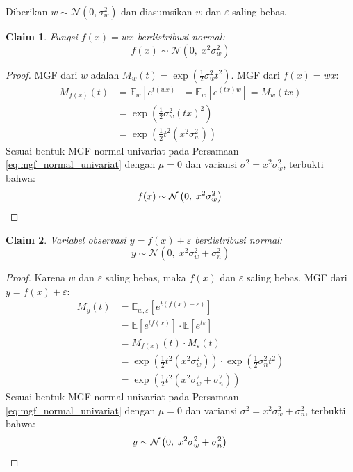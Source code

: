 \documentclass[11pt,a4paper]{article}
\theoremstyle{plain}
\newtheorem{claim}{Claim}[section]
\theoremstyle{definition}
\theoremstyle{remark}
\begin{document}
Diberikan $w \sim \mathcal{N}(0, \sigma_w^2)$ dan diasumsikan $w$ dan $\varepsilon$ saling bebas.

\begin{claim}
Fungsi $f(x) = wx$ berdistribusi normal:
\begin{equation}
f(x) \sim \mathcal{N}\left( 0, \; x^2 \sigma_w^2 \right)
\end{equation}
\end{claim}

\begin{proof}
MGF dari $w$ adalah $M_w(t) = \exp\left( \frac{1}{2}\sigma_w^2 t^2 \right)$. MGF dari $f(x) = wx$:
\begin{align}
M_{f(x)}(t) &= \mathbb{E}_w\left[ e^{t(wx)} \right] = \mathbb{E}_w\left[ e^{(tx)w} \right] = M_w(tx) \nonumber \\
&= \exp\left( \frac{1}{2}\sigma_w^2 (tx)^2 \right) \nonumber \\
&= \exp\left( \frac{1}{2} t^2 \left( x^2 \sigma_w^2 \right) \right) \label{eq:mgf_fx_kasus2}
\end{align}
Sesuai bentuk MGF normal univariat pada Persamaan \eqref{eq:mgf_normal_univariat} dengan $\mu = 0$ dan variansi $\sigma^2 = x^2 \sigma_w^2$, terbukti bahwa:
\begin{equation}
f(x) \sim \mathcal{N}\left( 0, \; x^2 \sigma_w^2 \right) \qedhere
\end{equation}
\end{proof}

\begin{claim}
Variabel observasi $y = f(x) + \varepsilon$ berdistribusi normal:
\begin{equation}
y \sim \mathcal{N}\left( 0, \; x^2 \sigma_w^2 + \sigma_n^2 \right)
\end{equation}
\end{claim}

\begin{proof}
Karena $w$ dan $\varepsilon$ saling bebas, maka $f(x)$ dan $\varepsilon$ saling bebas. MGF dari $y = f(x) + \varepsilon$:
\begin{align}
M_y(t) &= \mathbb{E}_{w, \varepsilon}\left[ e^{t(f(x) + \varepsilon)} \right] \nonumber \\
&= \mathbb{E}\left[ e^{t f(x)} \right] \cdot \mathbb{E}\left[ e^{t\varepsilon} \right] \nonumber \\
&= M_{f(x)}(t) \cdot M_\varepsilon(t) \nonumber \\
&= \exp\left( \frac{1}{2} t^2 \left( x^2 \sigma_w^2 \right) \right) \cdot \exp\left( \frac{1}{2} \sigma_n^2 t^2 \right) \nonumber \\
&= \exp\left( \frac{1}{2} t^2 \left( x^2 \sigma_w^2 + \sigma_n^2 \right) \right) \label{eq:mgf_y_kasus2}
\end{align}
Sesuai bentuk MGF normal univariat pada Persamaan \eqref{eq:mgf_normal_univariat} dengan $\mu = 0$ dan variansi $\sigma^2 = x^2 \sigma_w^2 + \sigma_n^2$, terbukti bahwa:
\begin{equation}
y \sim \mathcal{N}\left( 0, \; x^2 \sigma_w^2 + \sigma_n^2 \right) \qedhere
\end{equation}
\end{proof}
\end{document}
